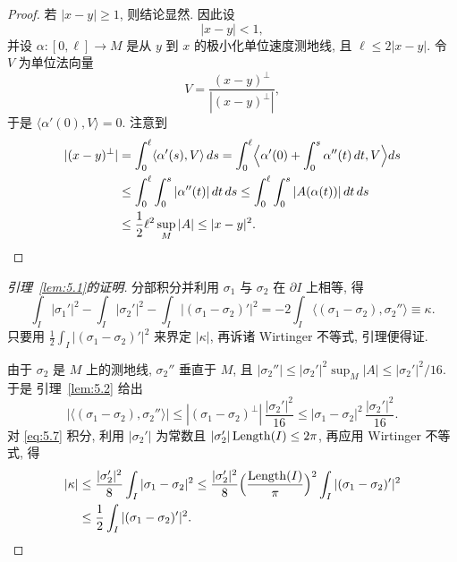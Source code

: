 \begin{proof}
若 $|x-y|\geq 1$, 则结论显然. 因此设
\begin{equation*}
|x-y|<1,
\end{equation*}
并设 $\alpha:[0,\ell]\to M$ 是从 $y$ 到 $x$ 的极小化单位速度测地线, 且
$\ell\leq 2|x-y|$. 令 $V$ 为单位法向量
\begin{equation*}
V=\frac{(x-y)^{\perp}}{|(x-y)^{\perp}|},
\end{equation*}
于是 $\langle\alpha'(0),V\rangle=0$. 注意到
\begin{equation}
\begin{aligned}
|(x-y)^{\perp}|
&=\int_0^{\ell}\langle\alpha'(s),V\rangle\,ds
 =\int_0^{\ell}\Bigl\langle\alpha'(0)+\int_0^s\alpha''(t)\,dt,V\Bigr\rangle ds\\
&\leq\int_0^{\ell}\int_0^s|\alpha''(t)|\,dt\,ds
 \leq\int_0^{\ell}\int_0^s|A(\alpha(t))|\,dt\,ds\\
&\leq\frac12\ell^2\sup_M|A|\leq|x-y|^2.
\end{aligned}
\label{eq:5.5}
\end{equation}
\end{proof}

\begin{proof}[引理~\ref{lem:5.1}的证明]
分部积分并利用 $\sigma_1$ 与 $\sigma_2$ 在 $\partial I$ 上相等, 得
\begin{equation}
\int_I|\sigma_1'|^2-\int_I|\sigma_2'|^2
-\int_I|(\sigma_1-\sigma_2)'|^2
=-2\int_I\bigl\langle(\sigma_1-\sigma_2),\sigma_2''\bigr\rangle
\equiv\kappa.
\label{eq:5.6}
\end{equation}
只要用 $\frac12\int_I|(\sigma_1-\sigma_2)'|^2$ 来界定 $|\kappa|$, 再诉诸
Wirtinger 不等式, 引理便得证.

由于 $\sigma_2$ 是 $M$ 上的测地线, $\sigma_2''$ 垂直于 $M$, 且
$|\sigma_2''|\leq|\sigma_2'|^2\sup_M|A|\leq|\sigma_2'|^2/16$. 于是
引理~\ref{lem:5.2} 给出
\begin{equation}
\bigl|\bigl\langle(\sigma_1-\sigma_2),\sigma_2''\bigr\rangle\bigr|
\leq|(\sigma_1-\sigma_2)^{\perp}|\,\frac{|\sigma_2'|^2}{16}
\leq|\sigma_1-\sigma_2|^2\,\frac{|\sigma_2'|^2}{16}.
\label{eq:5.7}
\end{equation}
对 \eqref{eq:5.7} 积分, 利用 $|\sigma_2'|$ 为常数且
$|\sigma_2'|\operatorname{Length}(I)\leq 2\pi$, 再应用 Wirtinger 不等式, 得
\begin{equation}
\begin{aligned}
|\kappa|
&\leq\frac{|\sigma_2'|^2}{8}\int_I|\sigma_1-\sigma_2|^2
 \leq\frac{|\sigma_2'|^2}{8}
 \Bigl(\frac{\operatorname{Length}(I)}{\pi}\Bigr)^2\int_I|(\sigma_1-\sigma_2)'|^2\\
&\leq\frac12\int_I|(\sigma_1-\sigma_2)'|^2.
\end{aligned}
\label{eq:5.8}
\end{equation}
\end{proof}

